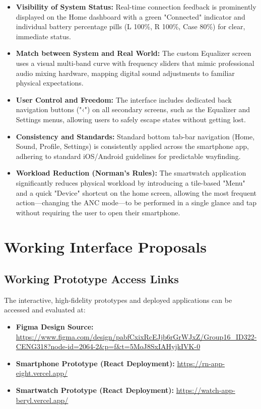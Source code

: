 \documentclass[12pt, a4paper]{report}
\begin{document}
\begin{itemize}
  \item \textbf{Visibility of System Status:} Real-time connection feedback is prominently displayed on the Home dashboard with a green "Connected" indicator and individual battery percentage pills (L 100\%, R 100\%, Case 80\%) for clear, immediate status.
  \item \textbf{Match between System and Real World:} The custom Equalizer screen uses a visual multi-band curve with frequency sliders that mimic professional audio mixing hardware, mapping digital sound adjustments to familiar physical expectations.
  \item \textbf{User Control and Freedom:} The interface includes dedicated back navigation buttons ("‹") on all secondary screens, such as the Equalizer and Settings menus, allowing users to safely escape states without getting lost.
  \item \textbf{Consistency and Standards:} Standard bottom tab-bar navigation (Home, Sound, Profile, Settings) is consistently applied across the smartphone app, adhering to standard iOS/Android guidelines for predictable wayfinding.
  \item \textbf{Workload Reduction (Norman's Rules):} The smartwatch application significantly reduces physical workload by introducing a tile-based "Menu" and a quick "Device" shortcut on the home screen, allowing the most frequent action---changing the ANC mode---to be performed in a single glance and tap without requiring the user to open their smartphone.
\end{itemize}


\chapter{Working Interface Proposals}

\section{Working Prototype Access Links}
The interactive, high-fidelity prototypes and deployed applications can be accessed and evaluated at:
\begin{itemize}
  \item \textbf{Figma Design Source:} \url{https://www.figma.com/design/pabfCxixRcEJjb6rGrWJxZ/Group16_ID322-CENG318?node-id=2064-2&p=f&t=5MoJ8SxIAHyjkIVK-0}
  \item \textbf{Smartphone Prototype (React Deployment):} \url{https://rn-app-eight.vercel.app/}
  \item \textbf{Smartwatch Prototype (React Deployment):} \url{https://watch-app-beryl.vercel.app/}
\end{itemize}
\end{document}
